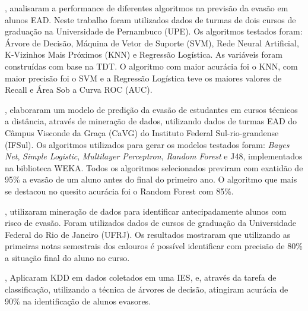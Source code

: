 , analisaram a performance de diferentes algoritmos
na previsão da evasão em alunos EAD. Neste trabalho foram utilizados dados de
turmas de dois cursos de graduação na Universidade de Pernambuco (UPE). Os
algoritmos testados foram: Árvore de Decisão, Máquina de Vetor de Suporte
(SVM), Rede Neural Artificial, K-Vizinhos Mais Próximos (KNN) e Regressão
Logística. As variáveis foram construídas com base na TDT. O algoritmo com maior
acurácia foi o KNN, com maior precisão foi o SVM e a Regressão Logística teve os
maiores valores de Recall e Área Sob a Curva ROC (AUC).

, elaboraram um modelo de predição da evasão de
estudantes em cursos técnicos a distância, através de mineração de dados,
utilizando dados de turmas EAD do Câmpus Visconde da Graça (CaVG) do Instituto
Federal Sul-rio-grandense (IFSul). Os algoritmos utilizados para gerar os
modelos testados foram: \textit{Bayes Net}, \textit{Simple Logistic},
\textit{Multilayer Perceptron}, \textit{Random Forest} e J48, implementados na
biblioteca WEKA. Todos os algoritmos selecionados previram com exatidão de 95\%
a evasão de um aluno antes do final do primeiro ano. O algoritmo que mais se
destacou no quesito acurácia foi o Random Forest com 85\%.

, utilizaram mineração de dados para identificar
antecipadamente alunos com risco de evasão. Foram utilizados dados de cursos de
graduação da Universidade Federal do Rio de Janeiro (UFRJ). Os resultados
mostraram que utilizando as primeiras notas semestrais dos calouros é possível
identificar com precisão de 80\% a situação final do aluno no curso.

, Aplicaram KDD em dados coletados em uma IES,
e, através da tarefa de classificação, utilizando a técnica de árvores de
decisão, atingiram acurácia de 90\% na identificação de alunos evasores.
